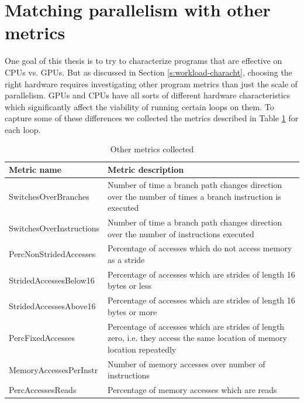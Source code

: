 \documentclass[12pt,twoside]{reedthesis}
\begin{document}
	\section{Matching parallelism with other metrics}
	
		One goal of this thesis is to try to characterize programs that are effective on CPUs vs. GPUs. But as discussed in Section \ref{s:workload-characht}, choosing the right hardware requires investigating other program metrics than just the scale of parallelism. GPUs and CPUs have all sorts of different hardware characteristics which significantly affect the viability of running certain loops on them. %
		To capture some of these differences we collected the metrics described in Table \ref{table:metric-names} for each loop.
		
		
		\begin{table}
			\caption{Other metrics collected}
			\label{table:metric-names}
			\begin{tabular}{ |p{4.5cm}|p{11cm}| }
				\hline
				Metric name & Metric description \\
				\hline \hline
				SwitchesOverBranches & Number of time a branch path changes direction over the number of times a branch instruction is executed \\ \hline
				SwitchesOverInstructions & Number of time a branch path changes direction over the number of instructions executed \\ \hline
				PercNonStridedAccesses & Percentage of accesses which do not access memory as a stride \\ \hline
				StridedAccessesBelow16 & Percentage of accesses which are strides of length 16 bytes or less \\ \hline
				StridedAccessesAbove16 &  Percentage of accesses which are strides of length 16 bytes or more \\ \hline
				PercFixedAccesses & Percentage of accesses which are strides of length zero, i.e. they access the same location of memory location repeatedly \\ \hline
				MemoryAccessesPerInstr & Number of memory accesses over number of instructions \\ \hline
				PercAccessesReads & Percentage of memory accesses which are reads  \\ \hline
			\end{tabular}
		\end{table}
		
\end{document}
